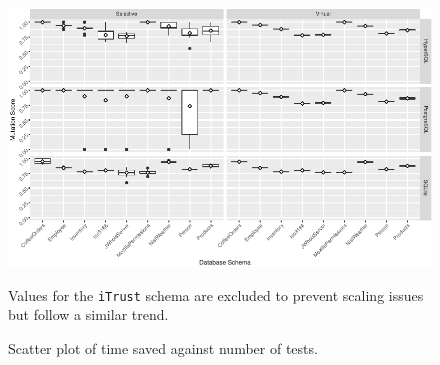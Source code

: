 
\begin{figure}[t]
  \centering
  \includegraphics[width=6in]{graphics/graphic_bwplot_schema_mutationscore_vm_tcm.pdf}
  \caption{Scatter plot of time saved against number of tests.}
  {\small Values for the \texttt{iTrust} schema are excluded to prevent scaling issues but follow a similar trend.}
\end{figure}


